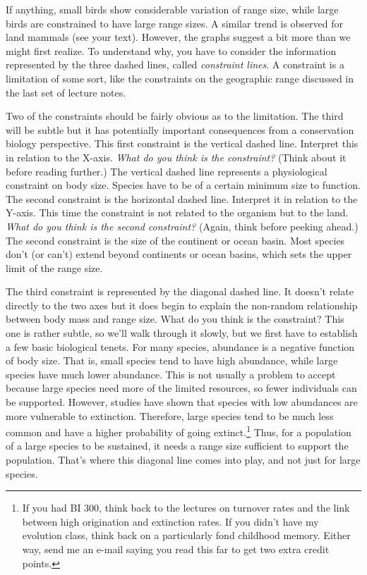 \documentclass[11pt, hidelinks]{article}
\begin{document}
If anything, small birds show considerable variation of range size, while large birds are constrained to have large range sizes.  A similar trend is observed for land mammals (see your text).  However, the graphs suggest a bit more than we might first realize.  To understand why, you have to consider the information represented by the three dashed lines, called \emph{constraint lines}.   A constraint is a limitation of some sort, like the constraints on the geographic range discussed in the last set of lecture notes.
 
Two of the constraints should be fairly obvious as to the limitation.  The third will be subtle but it has potentially important consequences from a conservation biology perspective.  This first constraint is the vertical dashed line.  Interpret this in relation to the X-axis. \emph{What do you think is the constraint?} (Think about it before reading further.) The vertical dashed line represents a physiological constraint on body size.  Species have to be of a certain minimum size to function. The second constraint is the horizontal dashed line. Interpret it in relation to the Y-axis. This time the constraint is not related to the organism but to the land.  \emph{What do you think is the second constraint?} (Again, think before peeking ahead.)  The second constraint is the size of the continent or ocean basin.  Most species don't (or can't) extend beyond continents or ocean basins, which sets the upper limit of the range size.

The third constraint is represented by the diagonal dashed line.  It doesn't relate directly to the two axes but it does begin to explain the non-random relationship between body mass and range size. What do you think is the constraint? This one is rather subtle, so we'll walk through it slowly, but we first have to establish a few basic biological tenets.  For many species, abundance is a negative function of body size.  That is, small species tend to have high abundance, while large species have much lower abundance.  This is not usually a problem to accept because large species need more of the limited resources, so fewer individuals can be supported.  However, studies have shown that species with low abundances are more vulnerable to extinction.  Therefore, large species tend to be much less common and have a higher probability of going extinct.\footnote{If you had BI 300, think back to the lectures on turnover rates and the link between high origination and extinction rates.  If you didn't have my evolution class, think back on a particularly fond childhood memory.  Either way, send me an e-mail saying you read this far to get two extra credit points.}  Thus, for a population of a large species to be sustained, it needs a range size sufficient to support the population.  That's where this diagonal line comes into play, and not just for large species. 
 
\end{document}
